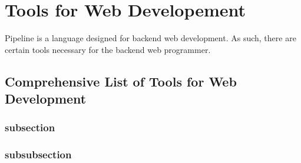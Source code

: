\documentclass[./LRM_main.tex]{subfiles}
\begin{document}
\section{Tools for Web Developement}
Pipeline is a language designed for backend web development. As such, there are certain tools necessary for the backend web programmer.
\subsection{Comprehensive List of Tools for Web Development}
\subsubsection{subsection}
\subsubsection{subsubsection}
\end{document}
